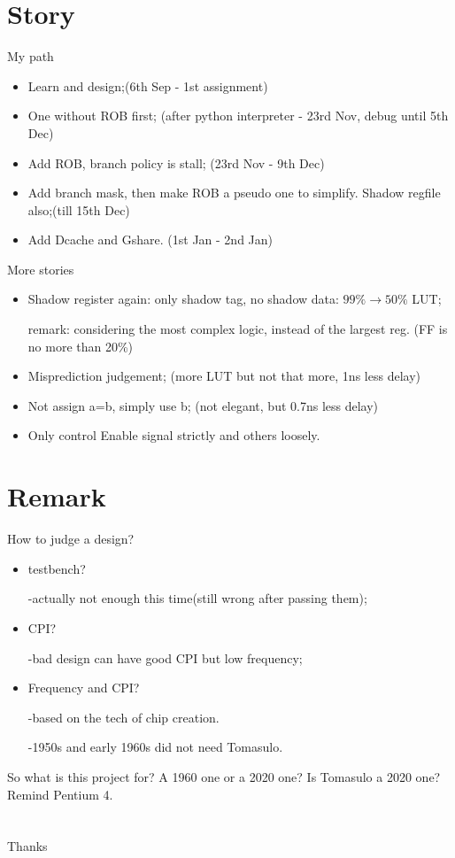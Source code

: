 \documentclass{beamer}
\begin{document}
\section{Story}
\begin{frame}{My path}
    \begin{itemize}
        \item Learn and design;(6th Sep - 1st assignment)
        \item One without ROB first; 
        (after python interpreter - 23rd Nov, debug until 5th Dec)
        \item Add ROB, branch policy is stall; (23rd Nov - 9th Dec)
        \item Add branch mask, then make ROB a pseudo one to simplify. 
        Shadow regfile also;(till 15th Dec) 
        \item Add Dcache and Gshare. (1st Jan - 2nd Jan)
    \end{itemize}
\end{frame}

\begin{frame}{More stories}
    \begin{itemize}
        \item Shadow register again: only shadow tag, no shadow data: $99\%\rightarrow50\%$ LUT; 
        
        remark: considering the most complex logic, instead of the largest reg. (FF is no more than 20\%)

        \item Misprediction judgement; (more LUT but not that more, 1ns less delay)
        \item Not assign a=b, simply use b; (not elegant, but 0.7ns less delay)
        \item Only control Enable signal strictly and others loosely. 
    \end{itemize}
\end{frame}

\section{Remark}
\begin{frame}{How to judge a design?}
    \begin{itemize}
        \item testbench? 
        
        -actually not enough this time(still wrong after passing them);
        \item CPI? 
        
        -bad design can have good CPI but low frequency;

        \item Frequency and CPI? 
        
        -based on the tech of chip creation. 

        -1950s and early 1960s did not need Tomasulo. 
    \end{itemize}
    So what is this project for? A 1960 one or a 2020 one? Is Tomasulo a 2020 one? Remind Pentium 4. 
\end{frame}

\section{}
\begin{frame}
\Huge{\centerline{Thanks}}
\end{frame}
\end{document}
